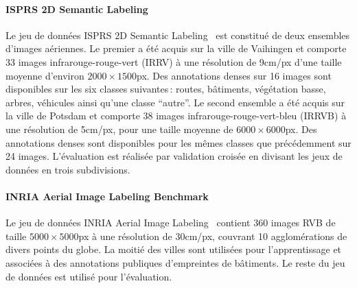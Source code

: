 \paragraph{ISPRS 2D Semantic Labeling}

Le jeu de données ISPRS 2D Semantic Labeling~\cite{rottensteiner_isprs_2012} est constitué de deux ensembles d'images aériennes. Le premier a été acquis sur la ville de Vaihingen et comporte 33 images infrarouge-rouge-vert (IRRV) à une résolution de 9cm/px d'une taille moyenne d'environ $2000\times1500$px. Des annotations denses sur 16 images sont disponibles sur les six classes suivantes\,: routes, bâtiments, végétation basse, arbres, véhicules ainsi qu'une classe ``autre''.
Le second ensemble a été acquis sur la ville de Potsdam et comporte 38 images infrarouge-rouge-vert-bleu (IRRVB) à une résolution de 5cm/px, pour une taille moyenne de $6000\times6000$px. Des annotations denses sont disponibles pour les mêmes classes que précédemment sur 24 images.
L'évaluation est réalisée par validation croisée en divisant les jeux de données en trois subdivisions.

\paragraph{INRIA Aerial Image Labeling Benchmark}
Le jeu de données INRIA Aerial Image Labeling~\cite{maggiori_can_2017} contient 360 images RVB de taille $5000\times5000$px à une résolution de 30cm/px, couvrant 10 agglomérations de divers points du globe. La moitié des villes sont utilisées pour l'apprentissage et associées à des annotations publiques d'empreintes de bâtiments. Le reste du jeu de données est utilisé pour l'évaluation.

